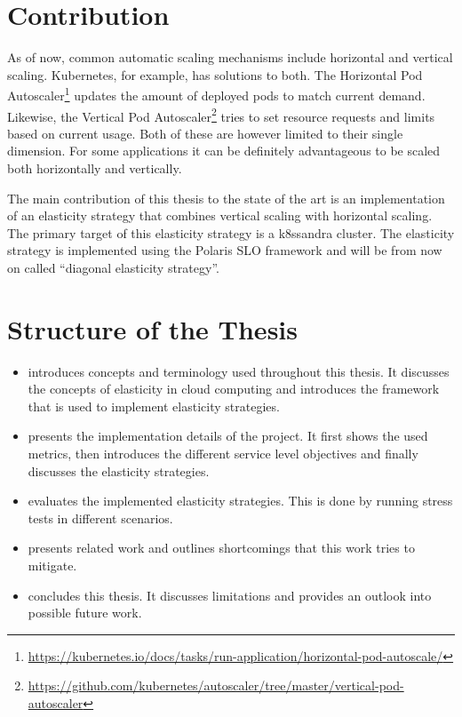 \section{Contribution}
\label{sec:contribution}

As of now, common automatic scaling mechanisms include horizontal and vertical scaling. Kubernetes, for example, has solutions to both. The Horizontal Pod Autoscaler\footnote{\raggedright\url{https://kubernetes.io/docs/tasks/run-application/horizontal-pod-autoscale/}} updates the amount of deployed pods to match current demand. Likewise, the Vertical Pod Autoscaler\footnote{\raggedright\url{https://github.com/kubernetes/autoscaler/tree/master/vertical-pod-autoscaler}} tries to set resource requests and limits based on current usage. Both of these are however limited to their single dimension. For some applications it can be definitely advantageous to be scaled both horizontally and vertically.

The main contribution of this thesis to the state of the art is an implementation of an elasticity strategy that combines vertical scaling with horizontal scaling. The primary target of this elasticity strategy is a k8ssandra cluster. The elasticity strategy is implemented using the Polaris SLO framework and will be from now on called ``diagonal elasticity strategy''.

\section{Structure of the Thesis}
\label{sec:structure}

\begin{itemize}
    \item {} introduces concepts and terminology used throughout this thesis. It discusses the concepts of elasticity in cloud computing and introduces the framework that is used to implement elasticity strategies.

    \item {} presents the implementation details of the project. It first shows the used metrics, then introduces the different service level objectives and finally discusses the elasticity strategies.

    \item {} evaluates the implemented elasticity strategies. This is done by running stress tests in different scenarios.

    \item {} presents related work and outlines shortcomings that this work tries to mitigate.

    \item {} concludes this thesis. It discusses limitations and provides an outlook into possible future work.
\end{itemize}
